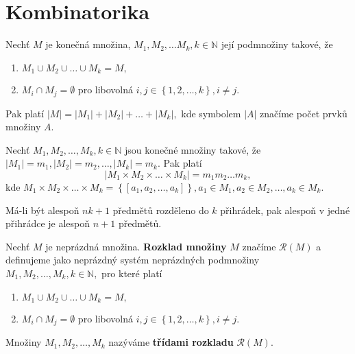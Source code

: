 \section{Kombinatorika}
\begin{veta}
    Nechť $M$ je konečná množina, $M_1, M_2, \dots M_k, k
    \in \mathbb N$ její podmnožiny takové, že
    \begin{enumerate}[$i.$]
    \item $M_1\cup M_2 \cup \dots \cup M_k = M,$
   	\item $M_i \cap M_j = \emptyset$ pro libovolná
    $i,j \in \left \{ 1,2,\dots,k \right \},i\ne j $.
    \end{enumerate}
    Pak platí $|M|=|M_1|+|M_2|+\dots +|M_k|,$ kde
    symbolem $|A|$ značíme počet prvků množiny $A$.
\end{veta}

\begin{veta}
    Nechť $M_1, M_2, \dots, M_k, k\in \mathbb N$ jsou konečné množiny takové,
    že $|M_1| = m_1, |M_2|=m_2, \dots, |M_k| = m_k.$ Pak platí
    $$|M_1\times M_2 \times \dots \times M_k| = m_1m_2\dots m_k,$$
    kde  $M_1\times M_2\times \dots \times M_k= \left \{ \left [ a_1, a_2, \dots, a_k \right ]  \right \}
    , a_1\in M_1, a_2 \in M_2, \dots, a_k \in M_k.$
\end{veta}

\begin{veta}
    Má-li být alespoň $nk+1$ předmětů rozděleno do $k$ přihrádek, pak
    alespoň v jedné přihrádce je alespoň $n+1$ předmětů.
\end{veta}

\begin{definition}
    Nechť $M$ je neprázdná množina. \textbf{Rozklad množiny} $M$ značíme
    $\mathscr R(M)$ a definujeme jako neprázdný systém neprázdných podmnožiny
    $M_1, M_2, \dots, M_k, k\in \mathbb N,$ pro které platí
    \begin{enumerate}[$i.$]
    \item $M_1\cup M_2 \cup \dots \cup M_k = M,$
   	\item $M_i \cap M_j = \emptyset$ pro libovolná
    $i,j \in \left \{ 1,2,\dots,k \right \},i\ne j $.
    \end{enumerate}
    Množiny $M_1, M_2, \dots, M_k$ nazýváme \textbf{třídami rozkladu} $\mathscr R(M).$
\end{definition}
